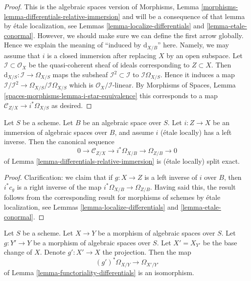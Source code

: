 \begin{proof}
This is the algebraic spaces version of
Morphisms, Lemma \ref{morphisms-lemma-differentials-relative-immersion}
and will be a consequence of that lemma by
\'etale localization, see
Lemmas \ref{lemma-localize-differentials} and
\ref{lemma-etale-conormal}.
However, we should make sure we can define the first arrow globally.
Hence we explain the meaning of ``induced by $\text{d}_{X/B}$'' here.
Namely, we may assume that $i$ is a closed immersion after replacing $X$
by an open subspace. Let $\mathcal{I} \subset \mathcal{O}_X$
be the quasi-coherent sheaf of ideals corresponding to $Z \subset X$.
Then $\text{d}_{X/S} : \mathcal{I} \to \Omega_{X/S}$
maps the subsheaf $\mathcal{I}^2 \subset \mathcal{I}$ to
$\mathcal{I}\Omega_{X/S}$. Hence it induces a map
$\mathcal{I}/\mathcal{I}^2 \to \Omega_{X/S}/\mathcal{I}\Omega_{X/S}$
which is $\mathcal{O}_X/\mathcal{I}$-linear.
By
Morphisms of Spaces, Lemma \ref{spaces-morphisms-lemma-i-star-equivalence}
this corresponds to a map $\mathcal{C}_{Z/X} \to i^*\Omega_{X/S}$ as desired.
\end{proof}

\begin{lemma}
\label{lemma-differentials-relative-immersion-section}
Let $S$ be a scheme. Let $B$ be an algebraic space over $S$.
Let $i : Z \to X$ be an immersion of algebraic spaces over $B$, and
assume $i$ (\'etale locally) has a left inverse. Then the canonical
sequence
$$
0 \to \mathcal{C}_{Z/X} \to i^*\Omega_{X/B} \to \Omega_{Z/B} \to 0
$$
of
Lemma \ref{lemma-differentials-relative-immersion}
is (\'etale locally) split exact.
\end{lemma}

\begin{proof}
Clarification: we claim that if $g : X \to Z$ is a left inverse of $i$
over $B$, then $i^*c_g$ is a right inverse of the map
$i^*\Omega_{X/B} \to \Omega_{Z/B}$.
Having said this, the result follows from the corresponding result for
morphisms of schemes by \'etale localization, see
Lemmas \ref{lemma-localize-differentials} and
\ref{lemma-etale-conormal}.
\end{proof}

\begin{lemma}
\label{lemma-base-change-differentials}
Let $S$ be a scheme.
Let $X \to Y$ be a morphism of algebraic spaces over $S$.
Let $g : Y' \to Y$ be a morphism of algebraic spaces over $S$.
Let $X' = X_{Y'}$ be the base change of $X$.
Denote $g' : X' \to X$ the projection.
Then the map
$$
(g')^*\Omega_{X/Y} \to \Omega_{X'/Y'}
$$
of
Lemma \ref{lemma-functoriality-differentials}
is an isomorphism.
\end{lemma}

